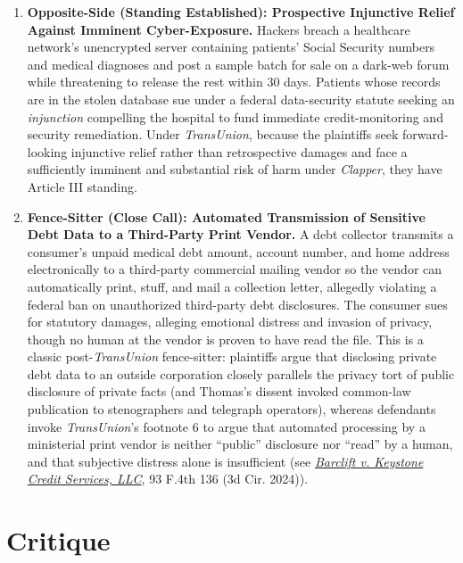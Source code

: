 \documentclass[12pt]{article}
\begin{document}
\begin{enumerate}
\item \textbf{Opposite-Side (Standing Established): Prospective Injunctive Relief Against Imminent Cyber-Exposure.} Hackers breach a healthcare network's unencrypted server containing patients' Social Security numbers and medical diagnoses and post a sample batch for sale on a dark-web forum while threatening to release the rest within 30 days. Patients whose records are in the stolen database sue under a federal data-security statute seeking an \textit{injunction} compelling the hospital to fund immediate credit-monitoring and security remediation. Under \textit{TransUnion}, because the plaintiffs seek forward-looking injunctive relief rather than retrospective damages and face a sufficiently imminent and substantial risk of harm under \textit{Clapper}, they have Article III standing.

\item \textbf{Fence-Sitter (Close Call): Automated Transmission of Sensitive Debt Data to a Third-Party Print Vendor.} A debt collector transmits a consumer's unpaid medical debt amount, account number, and home address electronically to a third-party commercial mailing vendor so the vendor can automatically print, stuff, and mail a collection letter, allegedly violating a federal ban on unauthorized third-party debt disclosures. The consumer sues for statutory damages, alleging emotional distress and invasion of privacy, though no human at the vendor is proven to have read the file. This is a classic post-\textit{TransUnion} fence-sitter: plaintiffs argue that disclosing private debt data to an outside corporation closely parallels the privacy tort of public disclosure of private facts (and Thomas's dissent invoked common-law publication to stenographers and telegraph operators), whereas defendants invoke \textit{TransUnion}'s footnote 6 to argue that automated processing by a ministerial print vendor is neither ``public'' disclosure nor ``read'' by a human, and that subjective distress alone is insufficient (see \href{https://www.supremecourt.gov/DocketPDF/23/23A952/308036/20240419131911550_Lower\%20Court\%20Opinions.pdf}{\textit{Barclift v. Keystone Credit Services, LLC}}, 93 F.4th 136 (3d Cir. 2024)).
\end{enumerate}

\section{Critique}
\end{document}
